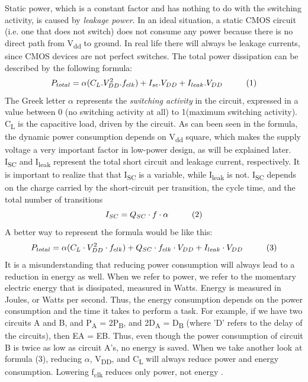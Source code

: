  Static power, which is a constant factor and has nothing to do with the switching activity, is caused by \textit{leakage power}. In an ideal situation, a static CMOS circuit (i.e. one that does not switch) does not consume any power because there is no direct path from V\textsubscript{dd} to ground. In real life there will always be leakage currents, since CMOS devices are not perfect switches. The total power dissipation can be described by the following formula:
\[P_{total} = \alpha(C_L . V_{DD}^2.f_{clk}) + I_{sc}. V_{DD} + I_{leak} . V_{DD}    \hspace{10mm} (1) \]
\vspace*{-2mm}
The Greek letter $\alpha$ represents the \textit{switching activity} in the circuit, expressed in a value between 0 (no switching activity at all) to 1(maximum switching activity). C\textsubscript{L} is the capacitive load, driven by the circuit. As can been seen in the formula, the dynamic power consumption depends on V\textsubscript{dd} square, which makes the supply voltage a very important factor in low-power design, as will be explained later. I\textsubscript{SC} and I\textsubscript{leak} represent the total short circuit and leakage current, respectively. It is important to realize that that I\textsubscript{SC} is a variable, while I\textsubscript{leak} is not. I\textsubscript{SC} depends on the charge carried by the short-circuit per transition, the cycle time, and the total number of transitions
\vspace*{-2mm}
\[I_{SC} = Q_{SC}  \cdot  f \cdot \alpha    \hspace{10mm} (2) \] 
\vspace*{-2mm}
A better way to represent the formula would be like this:
\vspace*{-2mm}
\[P_{total} = \alpha(C_L \cdot V_{DD}^2 \cdot f_{clk}) +  Q_{SC}  \cdot  f_{clk} \cdot V_{DD} + I_{leak} \cdot V_{DD}    \hspace{10mm} (3) \]
 It is a misunderstanding that reducing power consumption will always lead to a reduction in energy as well. When we refer to power, we refer to the momentary electric energy that is dissipated, measured in Watts. Energy is measured in Joules, or Watts per second. Thus, the energy consumption depends on the power consumption and the time it takes to perform a task. For example, if we have two circuits A and B, and P\textsubscript{A} = 2P\textsubscript{B}, and 2D\textsubscript{A} = D\textsubscript{B} (where ’D’ refers to the delay of the circuits), then EA = EB. Thus, even though the power consumption of circuit B is twice as low as circuit A’s, no energy is saved. When we take another look at formula (3), reducing $\alpha$, V\textsubscript{DD}, and C\textsubscript{L} will always reduce power and energy consumption. Lowering f\textsubscript{clk} reduces
only power, not energy \cite{PowerAwareArchitecting}.

